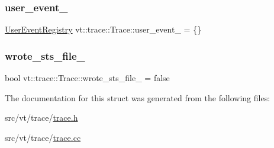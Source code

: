 \subsubsection{\texorpdfstring{user\+\_\+event\+\_\+}{user\_event\_}}
{\footnotesize\ttfamily \hyperlink{structvt_1_1trace_1_1_user_event_registry}{User\+Event\+Registry} vt\+::trace\+::\+Trace\+::user\+\_\+event\+\_\+ = \{\}\hspace{0.3cm}{\ttfamily [private]}}

\mbox{\label{structvt_1_1trace_1_1_trace_a1ee7ce001d317ebb4b30dc04e5902ca4}} 
\subsubsection{\texorpdfstring{wrote\+\_\+sts\+\_\+file\+\_\+}{wrote\_sts\_file\_}}
{\footnotesize\ttfamily bool vt\+::trace\+::\+Trace\+::wrote\+\_\+sts\+\_\+file\+\_\+ = false\hspace{0.3cm}{\ttfamily [private]}}



The documentation for this struct was generated from the following files\+:\begin{DoxyCompactItemize}
\item 
src/vt/trace/\hyperlink{trace_8h}{trace.\+h}\item 
src/vt/trace/\hyperlink{trace_8cc}{trace.\+cc}\end{DoxyCompactItemize}
